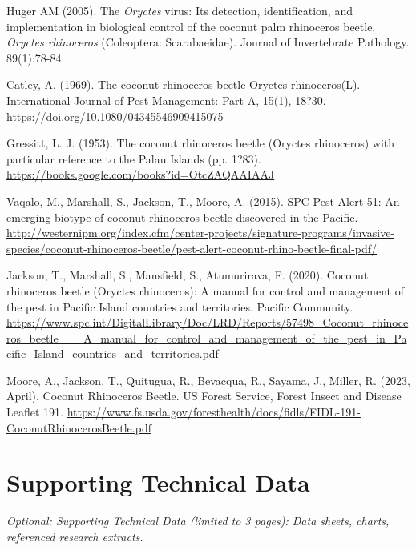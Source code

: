\documentclass[11pt,english,letterpaper]{scrartcl}
\begin{document}
\begin{thebibliography}{1}
 Huger AM (2005). The \textit{Oryctes} virus: Its detection, identification, and implementation in biological control of the coconut palm rhinoceros beetle, \textit{Oryctes rhinoceros} (Coleoptera: Scarabaeidae). Journal of Invertebrate Pathology. 89(1):78-84.

 Catley, A. (1969). The coconut rhinoceros beetle Oryctes rhinoceros(L). International Journal of Pest Management: Part A, 15(1), 18?30. \url{https://doi.org/10.1080/04345546909415075}

 Gressitt, L. J. (1953). The coconut rhinoceros beetle (Oryctes rhinoceros) with particular reference to the Palau Islands (pp. 1?83). \url{https://books.google.com/books?id=OtcZAQAAIAAJ}

 Vaqalo, M., Marshall, S., Jackson, T., Moore, A. (2015). SPC Pest Alert 51: An emerging biotype of coconut rhinoceros beetle discovered in the Pacific. \url{http://westernipm.org/index.cfm/center-projects/signature-programs/invasive-species/coconut-rhinoceros-beetle/pest-alert-coconut-rhino-beetle-final-pdf/}

 Jackson, T., Marshall, S., Mansfield, S., Atumurirava, F. (2020). Coconut rhinoceros beetle (Oryctes rhinoceros): A manual for control and management of the pest in Pacific Island countries and territories. Pacific Community. \url{https://www.spc.int/DigitalLibrary/Doc/LRD/Reports/57498_Coconut_rhinoceros_beetle___A_manual_for_control_and_management_of_the_pest_in_Pacific_Island_countries_and_territories.pdf}

 Moore, A., Jackson, T., Quitugua, R., Bevacqua, R., Sayama, J., Miller, R. (2023, April). Coconut Rhinoceros Beetle. US Forest Service, Forest Insect and Disease Leaflet 191. \url{https://www.fs.usda.gov/foresthealth/docs/fidls/FIDL-191-CoconutRhinocerosBeetle.pdf}

\end{thebibliography}
\endgroup



\clearpage
\section{Supporting Technical Data}

\textit{Optional: Supporting Technical Data (limited to 3 pages): Data sheets, charts, referenced research extracts.} \\
\end{document}

